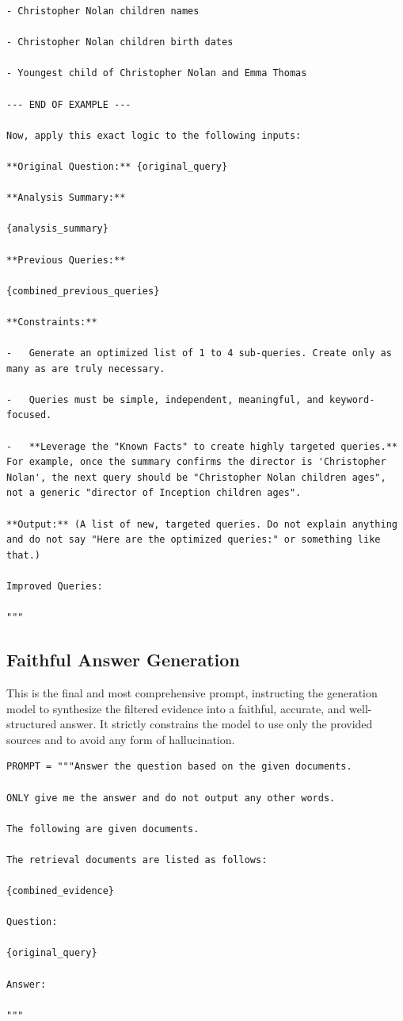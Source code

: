 \documentclass[11pt]{article}
\begin{document}
\begin{lstlisting}[basicstyle=\scriptsize\ttfamily]
- Christopher Nolan children names

- Christopher Nolan children birth dates

- Youngest child of Christopher Nolan and Emma Thomas

--- END OF EXAMPLE ---

Now, apply this exact logic to the following inputs:

**Original Question:** {original_query}

**Analysis Summary:**

{analysis_summary}

**Previous Queries:**

{combined_previous_queries}

**Constraints:**

-   Generate an optimized list of 1 to 4 sub-queries. Create only as many as are truly necessary.

-   Queries must be simple, independent, meaningful, and keyword-focused.

-   **Leverage the "Known Facts" to create highly targeted queries.** For example, once the summary confirms the director is 'Christopher Nolan', the next query should be "Christopher Nolan children ages", not a generic "director of Inception children ages".

**Output:** (A list of new, targeted queries. Do not explain anything and do not say "Here are the optimized queries:" or something like that.)

Improved Queries:

"""
\end{lstlisting}

\subsection{Faithful Answer Generation}

This is the final and most comprehensive prompt, instructing the generation model to synthesize the filtered evidence into a faithful, accurate, and well-structured answer. It strictly constrains the model to use only the provided sources and to avoid any form of hallucination.

\begin{lstlisting}[basicstyle=\scriptsize\ttfamily]
PROMPT = """Answer the question based on the given documents.

ONLY give me the answer and do not output any other words.

The following are given documents.

The retrieval documents are listed as follows:

{combined_evidence}

Question:

{original_query}

Answer:

"""
\end{lstlisting}
\end{document}
